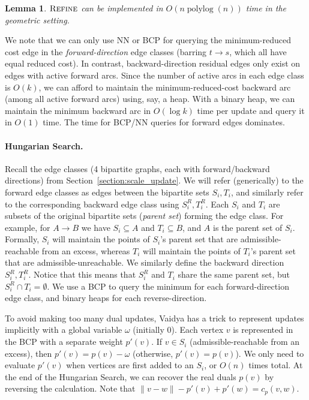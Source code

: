 \documentclass[11pt]{article}
\def\polylog{\mathop{\mathrm{polylog}}}
\def\Refine{\textsc{Refine}}
\theoremstyle{plain}
\newtheorem{lemma}{Lemma}
\begin{document}
\begin{lemma}
\label{lemma:refine_time}
	$\Refine$ can be implemented in $O(n\polylog(n))$ time in the geometric setting.
\end{lemma}

We note that we can only use NN or BCP for querying the minimum-reduced cost edge
in the \emph{forward-direction} edge classes (barring $t \to s$, which all have equal reduced cost).
In contrast, backward-direction residual edges only exist on edges with active forward arcs.
Since the number of active arcs in each edge class is $O(k)$, 
we can afford to maintain the minimum-reduced-cost backward arc 
(among all active forward arcs) using, say, a heap.
With a binary heap, we can maintain the minimum backward arc in 
$O(\log k)$ time per update and query it in $O(1)$ time.
The time for BCP/NN queries for forward edges dominates.


\paragraph{Hungarian Search.}
Recall the edge classes (4 bipartite graphs, each with forward/backward directions) 
from Section~\ref{section:scale_update}.
We will refer (generically) to the forward edge classes as edges between the bipartite sets $S_i, T_i$,
and similarly refer to the corresponding backward edge class using $S^R_i, T^R_i$.
Each $S_i$ and $T_i$ are subsets of the original bipartite sets (\emph{parent set}) forming the edge class.
For example, for $A \to B$ we have $S_i \subseteq A$ and $T_i \subseteq B$, 
and $A$ is the parent set of $S_i$.
Formally, $S_i$ will maintain the points of $S_i$'s parent set that are admissible-reachable from an excess,
whereas $T_i$ will maintain the points of $T_i$'s parent set that are admissible-unreachable.
We similarly define the backward direction $S^R_i, T^R_i$.
Notice that this means that $S^R_i$ and $T_i$ share the same parent set, but $S^R_i \cap T_i = \emptyset$.
We use a BCP to query the minimum for each forward-direction edge class, 
and binary heaps for each reverse-direction.

To avoid making too many dual updates, 
Vaidya has a trick to represent updates implicitly with a global variable $\omega$ (initially 0).
Each vertex $v$ is represented in the BCP with a separate weight $p'(v)$.
If $v \in S_i$ (admissible-reachable from an excess), then $p'(v) = p(v) - \omega$ (otherwise, $p'(v) = p(v)$).
We only need to evaluate $p'(v)$ when vertices are first added to an $S_i$, or $O(n)$ times total.
At the end of the Hungarian Search, we can recover the real duals $p(v)$ by reversing the calculation.
Note that $\|v - w\| - p'(v) + p'(w) = c_p(v, w)$.
\end{document}
